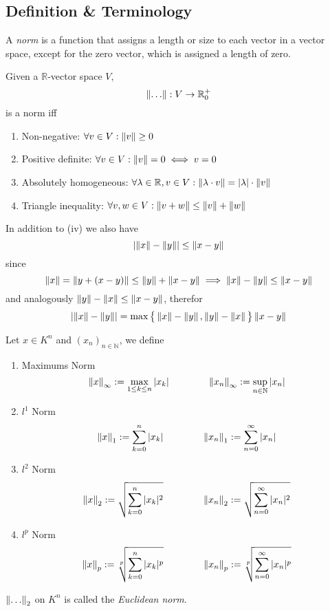 \subsection{Definition \& Terminology}
A \emph{norm} is a function that assigns a length or size to each vector in a vector space, except for the zero vector, which is assigned a length of zero.
\begin{definition}[Norm]\label{def:norm}
   Given a \(\mathbb{R}\)-vector space \(V\),
   \[\left\lVert\ldots\right\rVert: V \to \mathbb{R}_0^+\]
   is a norm iff
   \begin{enumerate}[label=\roman*, align=Center]
      \item Non-negative: \(\forall v \in V: \left\lVert v\right\rVert \geq 0\)
      \item Positive definite: \(\forall v \in V: \left\lVert v\right\rVert = 0 \iff v = 0\)
      \item Absolutely homogeneous: \(\forall \lambda \in \mathbb{R}, v \in V: \left\lVert\lambda \cdot v\right\rVert = |\lambda| \cdot \left\lVert v\right\rVert\)
      \item Triangle inequality: \(\forall v, w \in V: \left\lVert v + w\right\rVert \leq \left\lVert v\right\rVert + \left\lVert w\right\rVert\)
   \end{enumerate}
\end{definition}
\begin{remark}
   In addition to (iv) we also have
   \[\left\lvert\left\lVert x\right\rVert - \left\lVert y\right\rVert\right\rvert \leq \left\lVert x - y\right\rVert\]
   since
   \[\left\lVert x\right\rVert = \left\lVert y + (x - y)\right\rVert \leq \left\lVert y\right\rVert + \left\lVert x-y\right\rVert \implies \left\lVert x\right\rVert - \left\lVert y\right\rVert \leq \left\lVert x - y\right\rVert\]
   and analogously \(\left\lVert y\right\rVert - \left\lVert x\right\rVert \leq \left\lVert x-y\right\rVert\), therefor
   \[\left\lvert\left\lVert x\right\rVert - \left\lVert y\right\rVert\right\rvert = \max\big\{\left\lVert x\right\rVert - \left\lVert y\right\rVert, \left\lVert y\right\rVert-\left\lVert x\right\rVert\big\} \left\lVert x-y\right\rVert\]
\end{remark}

\begin{proposition}
   Let \(x \in K^n\) and \((x_n)_{n \in \mathbb{N}}\), we define
   \begin{enumerate}[label=\roman*, align=Center]
      \item Maximums Norm
         \[\left\lVert x\right\rVert_\infty := \max_{1 \leq k \leq n} |x_k| \qquad\qquad \left\lVert x_n\right\rVert_\infty := \sup_{n \in \mathbb{N}} |x_n|\]
      \item \(l^1\) Norm
         \[\left\lVert x\right\rVert_1 := \sum_{k=0}^n |x_k| \qquad\qquad \left\lVert x_n\right\rVert_1 := \sum_{n=0}^\infty |x_n|\]
      \item \(l^2\) Norm
         \[\left\lVert x\right\rVert_2 := \sqrt{\sum_{k=0}^n |x_k|^2} \qquad\qquad \left\lVert x_n\right\rVert_2 := \sqrt{\sum_{n=0}^\infty |x_n|^2}\]
      \item \(l^p\) Norm
         \[\left\lVert x\right\rVert_p := \sqrt[p]{\sum_{k=0}^n |x_k|^p} \qquad\qquad \left\lVert x_n\right\rVert_p := \sqrt[p]{\sum_{n=0}^\infty |x_n|^p}\]
   \end{enumerate}
\end{proposition}
\begin{remark}[Terminology]
   \(\left\lVert\ldots\right\rVert_2\) on \(K^n\) is called the \emph{Euclidean norm}.
\end{remark}


